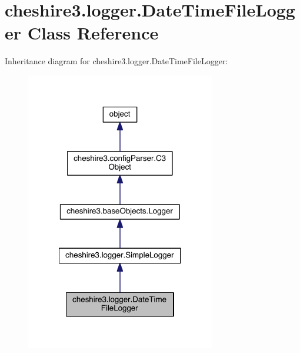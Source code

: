 \hypertarget{classcheshire3_1_1logger_1_1_date_time_file_logger}{\section{cheshire3.\-logger.\-Date\-Time\-File\-Logger Class Reference}
\label{classcheshire3_1_1logger_1_1_date_time_file_logger}
}


Inheritance diagram for cheshire3.\-logger.\-Date\-Time\-File\-Logger\-:
\nopagebreak
\begin{figure}[H]
\begin{center}
\leavevmode
\includegraphics[width=234pt]{classcheshire3_1_1logger_1_1_date_time_file_logger__inherit__graph}
\end{center}
\end{figure}


